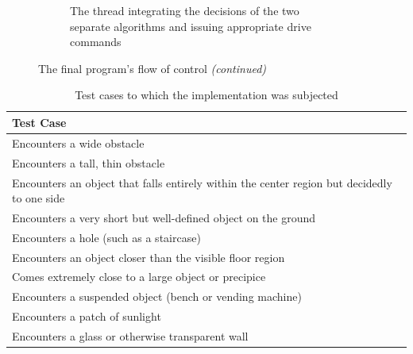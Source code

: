\documentclass[12pt]{report}
\begin{document}
\begin{figure}
\begin{subfigure}{\textwidth}
\caption[Integration and drive control]{The thread integrating the decisions of the two separate algorithms and issuing appropriate drive commands}
\label{fig:runtimepilot}
\end{subfigure}
\captionsetup{list=false}
\caption{The final program's flow of control \textit{(continued)}}
\label{fig:runtimecont}
\end{figure}

\begin{table}[h]
\caption[Test cases]{Test cases to which the implementation was subjected}
\label{tab:tests}
\begin{tabular}{| p{\textwidth} |}
\hline
\textbf{Test Case} \\
\hline\hline
Encounters a wide obstacle \\
\hline
Encounters a tall, thin obstacle \\
\hline
Encounters an object that falls entirely within the center region but decidedly to one side \\
\hline
Encounters a very short but well-defined object on the ground \\
\hline
Encounters a hole (such as a staircase) \\
\hline
Encounters an object closer than the visible floor region \\
\hline
Comes extremely close to a large object or precipice \\
\hline
Encounters a suspended object (bench or vending machine) \\
\hline
Encounters a patch of sunlight \\
\hline
Encounters a glass or otherwise transparent wall \\
\hline
\end{tabular}
\end{table}
\end{document}
